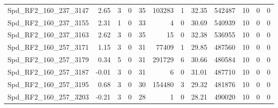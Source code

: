 \begin{longtable}[c]{@{}lrrrrrrrrrrr@{}}
Spd\_RF2\_160\_237\_3147      & 2.65                   & 3                       & 0                       & 35                     & 103283                  & 1                       & 32.35                   & 542487                   & 10                       & 0                        & 0                        \\
Spd\_RF2\_160\_237\_3155      & 2.31                   & 1                       & 0                       & 33                     & 4                       & 0                       & 30.69                   & 540939                   & 10                       & 0                        & 0                        \\
Spd\_RF2\_160\_237\_3163      & 2.62                   & 3                       & 0                       & 35                     & 15                      & 0                       & 32.38                   & 536955                   & 10                       & 0                        & 0                        \\
Spd\_RF2\_160\_257\_3171      & 1.15                   & 3                       & 0                       & 31                     & 77409                   & 1                       & 29.85                   & 487560                   & 10                       & 0                        & 0                        \\
Spd\_RF2\_160\_257\_3179      & 0.34                   & 5                       & 0                       & 31                     & 291729                  & 6                       & 30.66                   & 480584                   & 10                       & 0                        & 0                        \\
Spd\_RF2\_160\_257\_3187      & -0.01                  & 3                       & 0                       & 31                     & 6                       & 0                       & 31.01                   & 487710                   & 10                       & 0                        & 0                        \\
Spd\_RF2\_160\_257\_3195      & 0.68                   & 3                       & 0                       & 30                     & 154480                  & 3                       & 29.32                   & 481876                   & 10                       & 0                        & 0                        \\
Spd\_RF2\_160\_257\_3203      & -0.21                  & 3                       & 0                       & 28                     & 1                       & 0                       & 28.21                   & 490020                   & 10                       & 0                        & 0                        \\

\end{longtable}
